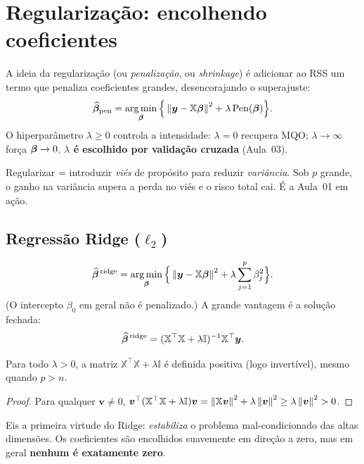 \documentclass[11pt,a4paper]{article}
\begin{document}
\section{Regularização: encolhendo coeficientes}
A ideia da regularização (ou \emph{penalização}, ou \emph{shrinkage}) é adicionar
ao RSS um termo que penaliza coeficientes grandes, desencorajando o superajuste:
\[
  \widehat{\bbeta}_{\text{pen}}
  = \argmin_{\bbeta}\Big\{ \norm{\bm{y}-\mathbb{X}\bbeta}^2
       + \lambda\, \mathrm{Pen}(\bbeta) \Big\}.
\]
O hiperparâmetro $\lambda\ge 0$ controla a intensidade: $\lambda=0$ recupera MQO;
$\lambda\to\infty$ força $\bm{\beta}\to 0$. \textbf{$\lambda$ é escolhido por validação
cruzada} (Aula~03).

\begin{ideia}
Regularizar = introduzir \emph{viés} de propósito para reduzir \emph{variância}.
Sob $p$ grande, o ganho na variância supera a perda no viés e o risco total cai.
É a Aula~01 em ação.
\end{ideia}

\subsection{Regressão Ridge ($\ell_2$)}
\begin{equation}\label{eq:ridge}
  \widehat{\bbeta}^{\,\text{ridge}}
   = \argmin_{\bbeta}\Big\{ \norm{\bm{y}-\mathbb{X}\bbeta}^2
       + \lambda \sum_{j=1}^{p}\beta_j^2 \Big\}.
\end{equation}
(O intercepto $\beta_0$ em geral não é penalizado.) A grande vantagem é a solução
fechada:
\begin{equation}\label{eq:ridgesol}
  \widehat{\bm{\beta}}^{\,\text{ridge}}
   = (\mathbb{X}^\top\mathbb{X} + \lambda \mathbb{I})^{-1}\mathbb{X}^\top\bm{y}.
\end{equation}

\begin{proposicao}
Para todo $\lambda>0$, a matriz $\mathbb{X}^\top\mathbb{X}+\lambda\mathbb{I}$ é definida
positiva (logo invertível), mesmo quando $p>n$.
\end{proposicao}
\begin{proof}
Para qualquer $\bm{v}\neq 0$,
$\bm{v}^\top(\mathbb{X}^\top\mathbb{X}+\lambda\mathbb{I})\bm{v}
=\left\lVert \mathbb{X}\bm{v} \right\rVert^2+\lambda\left\lVert \bm{v} \right\rVert^2\ge \lambda\left\lVert \bm{v} \right\rVert^2>0$.
\end{proof}
Eis a primeira virtude do Ridge: \emph{estabiliza} o problema mal-condicionado das
altas dimensões. Os coeficientes são encolhidos suavemente em direção a zero, mas
em geral \textbf{nenhum é exatamente zero}.
\end{document}
